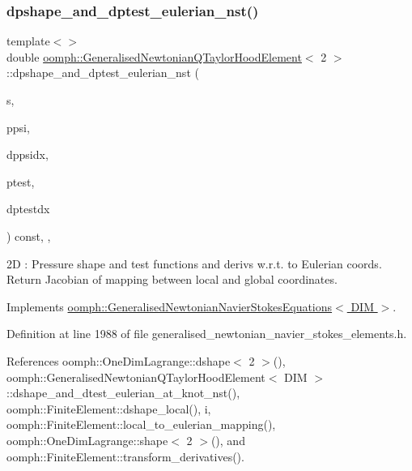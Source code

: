 \subsubsection{\texorpdfstring{dpshape\+\_\+and\+\_\+dptest\+\_\+eulerian\+\_\+nst()}{dpshape\_and\_dptest\_eulerian\_nst()}\hspace{0.1cm}{\footnotesize\ttfamily [2/3]}}
{\footnotesize\ttfamily template$<$$>$ \\
double \hyperlink{classoomph_1_1GeneralisedNewtonianQTaylorHoodElement}{oomph\+::\+Generalised\+Newtonian\+Q\+Taylor\+Hood\+Element}$<$ 2 $>$\+::dpshape\+\_\+and\+\_\+dptest\+\_\+eulerian\+\_\+nst (\begin{DoxyParamCaption}\item[{const \hyperlink{classoomph_1_1Vector}{Vector}$<$ double $>$ \&}]{s,  }\item[{\hyperlink{classoomph_1_1Shape}{Shape} \&}]{ppsi,  }\item[{\hyperlink{classoomph_1_1DShape}{D\+Shape} \&}]{dppsidx,  }\item[{\hyperlink{classoomph_1_1Shape}{Shape} \&}]{ptest,  }\item[{\hyperlink{classoomph_1_1DShape}{D\+Shape} \&}]{dptestdx }\end{DoxyParamCaption}) const\hspace{0.3cm}{\ttfamily [inline]}, {\ttfamily [protected]}, {\ttfamily [virtual]}}

2D \+: Pressure shape and test functions and derivs w.\+r.\+t. to Eulerian coords. Return Jacobian of mapping between local and global coordinates. 

Implements \hyperlink{classoomph_1_1GeneralisedNewtonianNavierStokesEquations_a00027d27dfdf3c0b72b0d1df9addfdc8}{oomph\+::\+Generalised\+Newtonian\+Navier\+Stokes\+Equations$<$ D\+I\+M $>$}.



Definition at line 1988 of file generalised\+\_\+newtonian\+\_\+navier\+\_\+stokes\+\_\+elements.\+h.



References oomph\+::\+One\+Dim\+Lagrange\+::dshape$<$ 2 $>$(), oomph\+::\+Generalised\+Newtonian\+Q\+Taylor\+Hood\+Element$<$ D\+I\+M $>$\+::dshape\+\_\+and\+\_\+dtest\+\_\+eulerian\+\_\+at\+\_\+knot\+\_\+nst(), oomph\+::\+Finite\+Element\+::dshape\+\_\+local(), i, oomph\+::\+Finite\+Element\+::local\+\_\+to\+\_\+eulerian\+\_\+mapping(), oomph\+::\+One\+Dim\+Lagrange\+::shape$<$ 2 $>$(), and oomph\+::\+Finite\+Element\+::transform\+\_\+derivatives().

